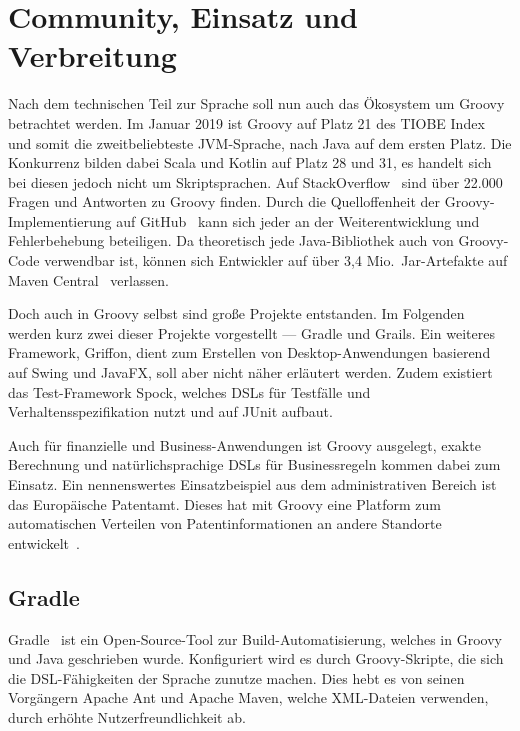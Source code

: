 \documentclass[a4paper]{article}
\begin{document}

\section{Community, Einsatz und Verbreitung}\label{sec:community}

Nach dem technischen Teil zur Sprache soll nun auch das Ökosystem um Groovy betrachtet werden.
Im Januar 2019 ist Groovy auf Platz 21 des TIOBE Index~\cite{tiobe-index} und somit die zweitbeliebteste JVM-Sprache, nach Java auf dem ersten Platz.
Die Konkurrenz bilden dabei Scala und Kotlin auf Platz 28 und 31, es handelt sich bei diesen jedoch nicht um Skriptsprachen.
Auf StackOverflow~\cite{stackoverflow:groovy} sind über 22.000 Fragen und Antworten zu Groovy finden.
Durch die Quelloffenheit der Groovy-Implementierung auf GitHub~\cite{github:groovy} kann sich jeder an der Weiterentwicklung und Fehlerbehebung beteiligen.
Da theoretisch jede Java-Bibliothek auch von Groovy-Code verwendbar ist, können sich Entwickler auf über 3,4 Mio.~Jar-Artefakte auf Maven Central~\cite{maven-central} verlassen.

Doch auch in Groovy selbst sind große Projekte entstanden.
Im Folgenden werden kurz zwei dieser Projekte vorgestellt --- Gradle und Grails.
Ein weiteres Framework, Griffon, dient zum Erstellen von Desktop-Anwendungen basierend auf Swing und JavaFX, soll aber nicht näher erläutert werden.
Zudem existiert das Test-Framework Spock, welches DSLs für Testfälle und Verhaltensspezifikation nutzt und auf JUnit aufbaut.

Auch für finanzielle und Business-Anwendungen ist Groovy ausgelegt, exakte Berechnung und natürlichsprachige DSLs für Businessregeln kommen dabei zum Einsatz.
Ein nennenswertes Einsatzbeispiel aus dem administrativen Bereich ist das Europäische Patentamt.
Dieses hat mit Groovy eine Platform zum automatischen Verteilen von Patentinformationen an andere Standorte entwickelt~\cite{epo}.

\subsection{Gradle}\label{subsec:gradle}

Gradle~\cite{gradle} ist ein Open-Source-Tool zur Build-Automatisierung, welches in Groovy und Java geschrieben wurde.
Konfiguriert wird es durch Groovy-Skripte, die sich die DSL-Fähigkeiten der Sprache zunutze machen.
Dies hebt es von seinen Vorgängern Apache Ant und Apache Maven, welche XML-Dateien verwenden, durch erhöhte Nutzerfreundlichkeit ab.
\end{document}

